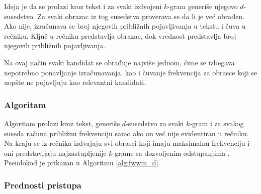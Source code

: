 \documentclass[12pt,oneside]{memoir}
\begin{document}
Ideja je da se prolazi kroz tekst i za svaki izdvojeni $k$-gram generiše njegovo $d$-susedstvo. Za svaki obrazac iz tog susedstva proverava se da li je već obrađen. Ako nije, izračunava se broj njegovih približnih pojavljivanja u tekstu i čuva u rečniku. Ključ u rečniku predstavlja obrazac, dok vrednost predstavlja broj njegovih približnih pojavljivanja.

Na ovaj način svaki kandidat se obrađuje najviše jednom, čime se izbegava nepotrebno ponavljanje izračunavanja, kao i čuvanje frekvencija za obrasce koji se uopšte ne pojavljuju kao relevantni kandidati.

\subsubsection{Algoritam}

Algoritam prolazi kroz tekst, generiše $d$-susedstvo za svaki $k$-gram i za svakog suseda računa približnu frekvenciju samo ako on već nije evidentiran u rečniku. Na kraju se iz rečnika izdvajaju svi obrasci koji imaju maksimalnu frekvenciju i oni predstavljaju najzastupljenije $k$-grame sa dozvoljenim odstupanjima \cite{matf_repo}. Pseudokod je prikazan u Algoritmu \ref{alg:fwwm_d}.

\begin{algorithm}[h]
\caption{Frequent Words with Mismatches (Dictionary)}
\label{alg:fwwm_d}
\SetAlgoLined
\DontPrintSemicolon
{}
\end{algorithm}



\subsubsection{Prednosti pristupa}
\end{document}
